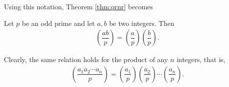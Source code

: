 \documentclass[12pt]{subfile}
\begin{document}
	Using this notation, Theorem \ref{thm:qrnr} becomes
	\begin{theorem}\label{thm:qrproduct}
		Let $p$ be an odd prime and let $a,b$ be two integers. Then
		\begin{align*}
			\left(\dfrac{ab}{p}\right) = \left(\dfrac{a}{p}\right) \left(\dfrac{b}{p}\right).
		\end{align*}
	\end{theorem}
	
	\begin{remark}
		Clearly, the same relation holds for the product of any $n$ integers, that is, 
		\begin{align*}
			\left(\dfrac{a_1a_2\cdots a_n}{p}\right) = \left(\dfrac{a_1}{p}\right) \left(\dfrac{a_2}{p}\right) \cdots \left(\dfrac{a_n}{p}\right).
		\end{align*}
	\end{remark}
	
\end{document}
